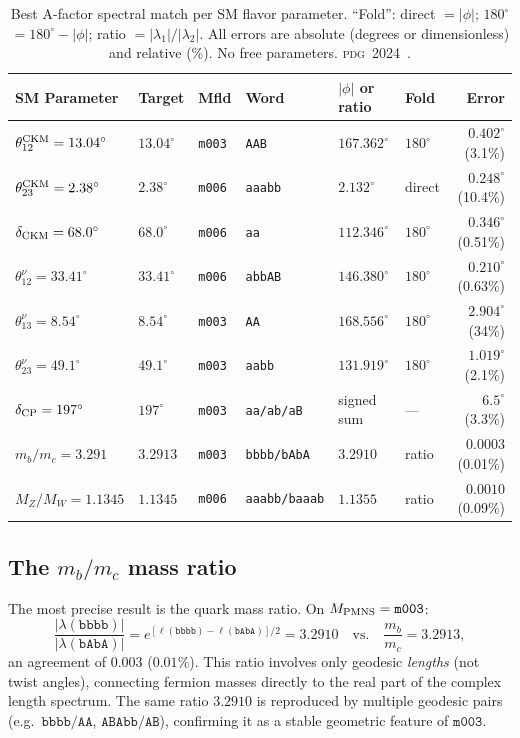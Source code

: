 \documentclass[a4paper,11pt]{article}
\newcommand{\mfld}[1]{\texttt{#1}}
\newcommand{\word}[1]{\texttt{#1}}
\newcommand{\degr}{^{\circ}}
\newcommand{\PDG}{\textsc{pdg}}
\begin{document}
\begin{table}[htbp]
\centering
\caption{Best A-factor spectral match per SM flavor parameter.
  ``Fold'': direct $=|\phi|$; $180\degr$$=180\degr-|\phi|$; ratio $=|\lambda_1|/|\lambda_2|$.
  All errors are absolute (degrees or dimensionless) and relative (\%).
  No free parameters. \PDG\ 2024~\cite{PDG2024}.}
\label{tab:headline}
\small
\begin{tabular}{llllllr}
\toprule
SM Parameter & Target & Mfld & Word & $|\phi|$ or ratio & Fold & Error \\
\midrule
$\theta_{12}^{\rm CKM}=13.04\degr$ & $13.04\degr$ & \mfld{m003} & \word{AAB} & $167.362\degr$ & $180\degr$ & $0.402\degr$ (3.1\%) \\
$\theta_{23}^{\rm CKM}=2.38\degr$ & $2.38\degr$ & \mfld{m006} & \word{aaabb} & $2.132\degr$ & direct & $0.248\degr$ (10.4\%) \\
$\delta_{\rm CKM}=68.0\degr$ & $68.0\degr$ & \mfld{m006} & \word{aa} & $112.346\degr$ & $180\degr$ & $0.346\degr$ (0.51\%) \\
$\theta_{12}^\nu=33.41\degr$ & $33.41\degr$ & \mfld{m006} & \word{abbAB} & $146.380\degr$ & $180\degr$ & $0.210\degr$ (0.63\%) \\
$\theta_{13}^\nu=8.54\degr$ & $8.54\degr$ & \mfld{m003} & \word{AA} & $168.556\degr$ & $180\degr$ & $2.904\degr$ (34\%) \\
$\theta_{23}^\nu=49.1\degr$ & $49.1\degr$ & \mfld{m003} & \word{aabb} & $131.919\degr$ & $180\degr$ & $1.019\degr$ (2.1\%) \\
$\delta_{\rm CP}=197\degr$ & $197\degr$ & \mfld{m003} & \word{aa/ab/aB} & signed sum & --- & $6.5\degr$ (3.3\%) \\
$m_b/m_c=3.291$ & $3.2913$ & \mfld{m003} & \word{bbbb/bAbA} & $3.2910$ & ratio & $0.0003$ (0.01\%) \\
$M_Z/M_W=1.1345$ & $1.1345$ & \mfld{m006} & \word{aaabb/baaab} & $1.1355$ & ratio & $0.0010$ (0.09\%) \\
\bottomrule
\end{tabular}
\end{table}

\subsection{The \texorpdfstring{$m_b/m_c$}{mb/mc} mass ratio}
\label{sec:mbmc}

The most precise result is the quark mass ratio.
On $M_{\rm PMNS}=\mfld{m003}$:
\begin{equation}
  \frac{|\lambda(\word{bbbb})|}{|\lambda(\word{bAbA})|}
  = e^{[\ell(\word{bbbb})-\ell(\word{bAbA})]/2}
  = 3.2910 \quad\text{vs.}\quad \frac{m_b}{m_c}=3.2913,
  \label{eq:mbmc}
\end{equation}
an agreement of $0.003$ ($0.01\%$).
This ratio involves only geodesic \emph{lengths} (not twist angles),
connecting fermion masses directly to the real part of the complex length spectrum.
The same ratio $3.2910$ is reproduced by multiple geodesic pairs
(e.g.\ $\word{bbbb}/\word{AA}$, $\word{ABAbb}/\word{AB}$),
confirming it as a stable geometric feature of $\mfld{m003}$.
\end{document}
